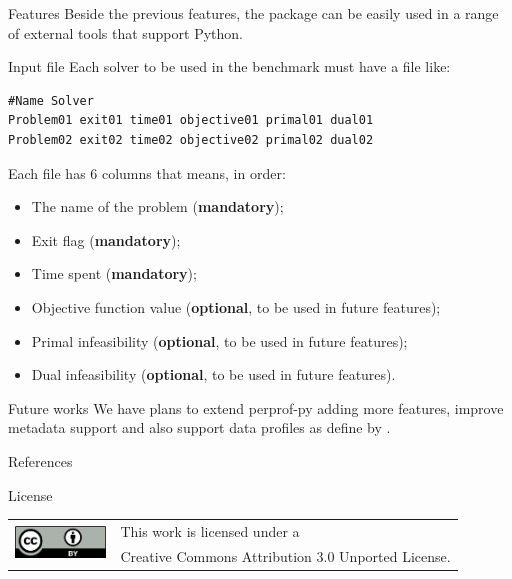 \documentclass[a0paper,portrait]{baposter}
\begin{document}
\begin{poster}
\begin{posterbox}[column=1]{Features}
    Beside the previous features, the package can be easily used in a range
    of external tools that support Python.
  \end{posterbox}

  \begin{posterbox}[column=1,below=auto]{Input file}
    Each solver to be used in the benchmark must have a file like:

    \begin{lstlisting}
#Name Solver
Problem01 exit01 time01 objective01 primal01 dual01
Problem02 exit02 time02 objective02 primal02 dual02
    \end{lstlisting}

    Each file has 6 columns that means, in order:
    \begin{itemize}
      \item The name of the problem (\textbf{mandatory});
      \item Exit flag (\textbf{mandatory});
      \item Time spent (\textbf{mandatory});
      \item Objective function value (\textbf{optional}, to be used in future
        features);
      \item Primal infeasibility (\textbf{optional}, to be used in future
        features);
      \item Dual infeasibility (\textbf{optional}, to be used in future
        features).
    \end{itemize}
  \end{posterbox}

  \begin{posterbox}[column=1,below=auto]{Future works}
    We have plans to extend perprof-py adding more features, improve metadata
    support and also support data profiles as define by \textcite{More2009}.
  \end{posterbox}

  \begin{posterbox}[column=1,below=auto]{References}
    \printbibliography[heading=none]
  \end{posterbox}

  \begin{posterbox}[column=1,below=auto,height=bottom]{License}
    \begin{tabular}{cl}
      \multirow{2}{*}{\includegraphics[height=24pt]{figures/cc-by}} &
      This work is licensed under a \\
      & Creative Commons Attribution 3.0 Unported License.
    \end{tabular}
  \end{posterbox}
\end{poster}
\end{document}

